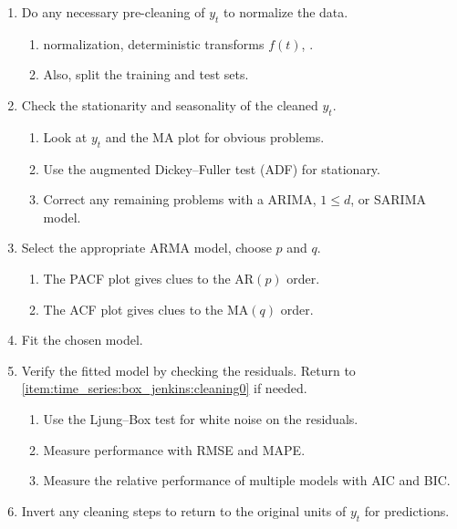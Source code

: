 \begin{enumerate}[noitemsep]
  \item Do any necessary pre-cleaning of $y_{t}$ to normalize the data.\label{item:time_series:box_jenkins:cleaning0}
  \begin{enumerate}[noitemsep]
    \item \Zscore normalization, deterministic transforms $f\left(t\right)$, \etc.\label{item:time_series:box_jenkins:cleaning0:detail}
    \item Also, split the training and test sets.\label{item:time_series:box_jenkins:cleaning0:train_test_split}
  \end{enumerate}
  \item Check the stationarity and seasonality of the cleaned $y_{t}$.\label{item:time_series:box_jenkins:assumptions}
  \begin{enumerate}[noitemsep]
    \item Look at $y_{t}$ and the MA plot for obvious problems.\label{item:time_series:box_jenkins:assumptions:eye}
    \item Use the augmented Dickey--Fuller test (ADF) for stationary.\label{item:time_series:box_jenkins:assumptions:ADF}
    \item Correct any remaining problems with a ARIMA, $1 \leq d$, or SARIMA model.\label{item:time_series:box_jenkins:assumptions:cleaning1}
  \end{enumerate}
  \item Select the appropriate ARMA model, \ie choose $p$ and $q$.\label{item:time_series:box_jenkins:order}
  \begin{enumerate}[noitemsep]
    \item The PACF plot gives clues to the $\text{AR}\left(p\right)$ order.\label{item:time_series:box_jenkins:order:PACF}
    \item The ACF plot gives clues to the $\text{MA}\left(q\right)$ order.\label{item:time_series:box_jenkins:order:ACF}
  \end{enumerate}
  \item Fit the chosen model.\label{item:time_series:box_jenkins:fit}
  \item Verify the fitted model by checking the residuals. Return to \cref{item:time_series:box_jenkins:cleaning0} if needed.\label{item:time_series:box_jenkins:verify}
  \begin{enumerate}[noitemsep]
    \item Use the Ljung--Box test for white noise on the residuals.\label{item:time_series:box_jenkins:verify:Ljung_Box}
    \item Measure performance with RMSE and MAPE.\label{item:time_series:box_jenkins:verify:RMSE_MAPE}
    \item Measure the relative performance of multiple models with AIC and BIC.\label{item:time_series:box_jenkins:verify:AIC_BIC}
  \end{enumerate}
  \item Invert any cleaning steps to return to the original units of $y_{t}$ for predictions.\label{item:time_series:box_jenkins:invert}
\end{enumerate}

